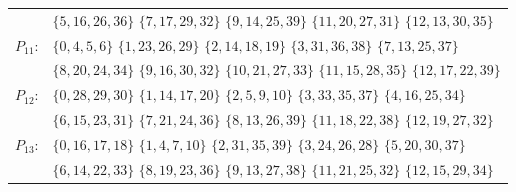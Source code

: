 \documentclass[11pt]{article}
\theoremstyle{definition}
\theoremstyle{remark}
\begin{document}
\begin{center}
\begin{tabular}{@{}ll@{}}
& $\{5,16,26,36\}$ $\{7,17,29,32\}$ $\{9,14,25,39\}$ $\{11,20,27,31\}$ $\{12,13,30,35\}$\\[2pt]
$P_{11}$: & $\{0,4,5,6\}$ $\{1,23,26,29\}$ $\{2,14,18,19\}$ $\{3,31,36,38\}$ $\{7,13,25,37\}$\\
& $\{8,20,24,34\}$ $\{9,16,30,32\}$ $\{10,21,27,33\}$ $\{11,15,28,35\}$ $\{12,17,22,39\}$\\[2pt]
$P_{12}$: & $\{0,28,29,30\}$ $\{1,14,17,20\}$ $\{2,5,9,10\}$ $\{3,33,35,37\}$ $\{4,16,25,34\}$\\
& $\{6,15,23,31\}$ $\{7,21,24,36\}$ $\{8,13,26,39\}$ $\{11,18,22,38\}$ $\{12,19,27,32\}$\\[2pt]
$P_{13}$: & $\{0,16,17,18\}$ $\{1,4,7,10\}$ $\{2,31,35,39\}$ $\{3,24,26,28\}$ $\{5,20,30,37\}$\\
& $\{6,14,22,33\}$ $\{8,19,23,36\}$ $\{9,13,27,38\}$ $\{11,21,25,32\}$ $\{12,15,29,34\}$\\[2pt]
\end{tabular}
\end{center}
\end{document}
